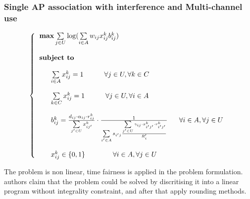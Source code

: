 \documentclass[journal,transmag]{IEEEtran}
\begin{document}
\subsubsection{Single AP association with interference and Multi-channel use} 
\begin{footnotesize}
\begin{equation}
\left\{
\begin{tabular}{l}
$\textbf{max}  \sum\limits_{j \in U} \log ( \sum\limits_{i \in A} w_{ij} x_{ij}^k  b_{ij}^k) $ \\         
\\
\textbf{subject to} \\
\\
~~~~~$ \sum\limits_{i \in A} x_{ij}^k = 1 ~~~~~~~~~ \forall j \in U, \forall k \in C  $ \\ 

\\
~~~~~$ \sum\limits_{k \in C} x_{ij}^k = 1 ~~~~~~~~~ \forall j \in U, \forall i \in A  $ \\

\\
~~~~~$ b_{ij}^k = \frac{d_{ij} \cdot \alpha_{ij} \cdot r_{ij}^k}{\sum\limits_{j' \in U} x_{ij'}^k} \cdot \frac{1}{\sum\limits_{i' \in A} s_{i'j} \frac{\sum\limits_{j' \in U} \gamma_{ij} \cdot x_{i'j'}^k \cdot r_{i'j'}^k}{R_i'}} $ ~~~ $\forall i \in A, \forall j \in U $  \\

\\
~~~~~$ x_{ij}^k \in \{0,1\} ~~~~~~~~~~~~ \forall i \in A, \forall j \in U $ \\

\end{tabular}
\right.
\end{equation}
\end{footnotesize}

The problem is non linear, time fairness is applied in the problem formulation. authors claim that the problem could be solved by discritising it into a linear program without integrality constraint, and after that apply rounding methods.  
\end{document}
